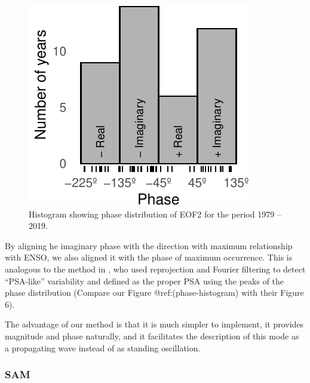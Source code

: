\documentclass[smallextended]{svjour3}       %
\begin{document}
\begin{figure}
\centering
\includegraphics{../figures/phase-histogram-1.pdf}
\caption{\label{fig:phase-histogram}Histogram showing phase distribution of EOF2 for the period 1979 -- 2019.}
\end{figure}

By aligning he imaginary phase with the direction with maximum relationship with ENSO, we also aligned it with the phase of maximum occurrence. This is analogous to the method in \citet{irving2016}, who used reprojection and Fourier filtering to detect ``PSA-like'' variability and defined as the proper PSA using the peaks of the phase distribution (Compare our Figure @ref:(phase-histogram) with their Figure 6).

The advantage of our method is that it is much simpler to implement, it provides magnitude and phase naturally, and it facilitates the description of this mode as a propagating wave instead of as standing oscillation.

\hypertarget{sam}{%
\subsubsection{SAM}\label{sam}}
\end{document}
